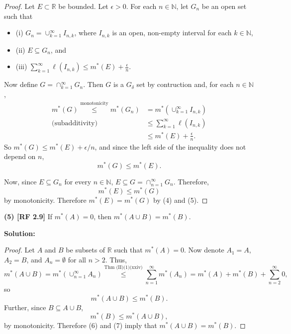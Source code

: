 \documentclass[12pt]{article}
\begin{document}
\begin{proof}
Let $E \subset \mathbb{R}$ be bounded. Let $\epsilon > 0$. For each $n \in
\mathbb{N}$, let $G_{n}$ be an open set such that 

\begin{itemize}[label={},leftmargin=8mm, itemsep=1em, parsep=0em]
\item (i) $G_{n} = \cup_{k=1}^{\infty}I_{n,k}$, where $I_{n,k}$ is an open,
non-empty interval for each $k \in \mathbb{N}$,
\item (ii) $E \subseteq G_{n}$, and 
\item (iii) $\sum_{k=1}^{\infty}\ell(I_{n,k}) \leq m^{*}(E) +
\frac{\epsilon}{n}$.
\end{itemize}
Now define $G = \cap_{k=1}^{\infty}G_{n}$. Then $G$ is a $G_{\delta}$ set by
contruction and, for each $n\in\mathbb{N}$,
\begin{align*}
m^{*}(G) \stackrel{\text{monotonicity}}{\leq} m^{*}(G_{n}) & =
m^{*}\left(\cup_{k=1}^{\infty}I_{n,k}\right) \\
\text{(subadditivity)} \qquad & \leq \sum_{k=1}^{\infty}\ell(I_{n,k}) \\
& \leq m^{*}(E) + \frac{\epsilon}{n}.
\end{align*}
So $m^{*}(G) \leq m^{*}(E) + \epsilon / n$, and since the left side of the
inequality does not depend on $n$, 
\begin{equation}
m^{*}(G) \leq m^{*}(E).
\end{equation}

Now, since $E \subseteq G_{n}$ for every $n \in \mathbb{N}$, $E \subseteq G =
\cap_{n=1}^{\infty}G_{n}$. Therefore, 
\begin{equation}
m^{*}(E) \leq m^{*}(G)
\end{equation} 
by monotonicity. Therefore $m^{*}(E) = m^{*}(G)$ by (4) and (5).
\end{proof}

{\bf (5) [RF 2.9]} If $m^{*}(A) = 0$, then $m^{*}(A\cup B) = m^{*}(B)$.

{\bf Solution:}

\begin{proof}
Let $A$ and $B$ be subsets of $\mathbb{R}$ such that $m^{*}(A) = 0$. Now denote
$A_{1} = A$, $A_{2} = B$, and $A_{n} = \emptyset$ for all $n > 2$. Thus,
\[ m^{*}(A\cup B) = m^{*}\left( \cup_{n=1}^{\infty}A_{n} \right)
\stackrel{\text{Thm (II)(1)(xxiv)}}{\leq} \sum_{n=1}^{\infty}m^{*}(A_{n}) =
m^{*}(A) + m^{*}(B) + \sum_{n=2}^{\infty} 0, \]
so 
\begin{equation}
m^{*}(A \cup B) \leq m^{*}(B).
\end{equation}
Further, since $B \subseteq A\cup B$, 
\begin{equation}
m^{*}(B) \leq m^{*}(A\cup B),
\end{equation}
by monotonicity. Therefore (6) and (7) imply that $m^{*}(A\cup B) = m^{*}(B)$.
\end{proof}
\end{document}
